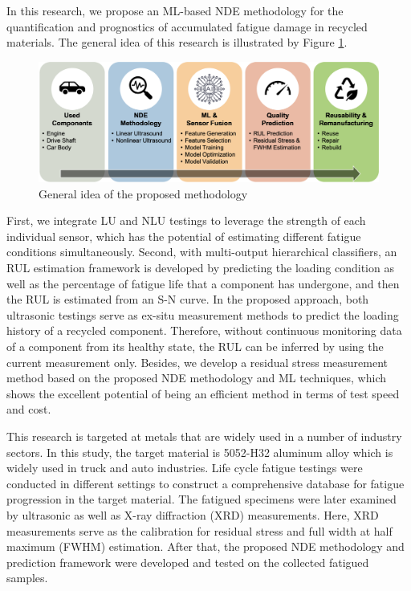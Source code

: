 In this research, we propose an ML-based NDE methodology for the quantification and prognostics of accumulated fatigue damage in recycled materials. The general idea of this research is illustrated by Figure \ref{fig: general idea}.
\begin{figure}[tb]
    \centering
    \includegraphics[width=\linewidth]{fig/general_idea.png}
    \caption{General idea of the proposed methodology}
    \label{fig: general idea}
\end{figure}
 First, we integrate LU and NLU testings to leverage the strength of each individual sensor, which has the potential of estimating different fatigue conditions simultaneously.
Second, with multi-output hierarchical classifiers,
an RUL estimation framework is developed by predicting the loading condition as well as the percentage of fatigue life that a component has undergone, and then the RUL is estimated from an S-N curve. In the proposed approach, both ultrasonic testings serve as ex-situ measurement methods to predict the loading history of a recycled component. Therefore, without continuous monitoring data of a component from its healthy state, the RUL can be inferred by using the current measurement only. Besides, we develop a residual stress measurement method based on the proposed NDE methodology and ML techniques, which shows the excellent potential of being an efficient method in terms of test speed and cost.

This research is targeted at metals that are widely used in a number of industry sectors. In this study, the target material is 5052-H32 aluminum alloy which is widely used in truck and auto industries. Life cycle fatigue testings were conducted in different settings to construct a comprehensive database for fatigue progression in the target material. The fatigued specimens were later examined by ultrasonic as well as X-ray diffraction (XRD) measurements. Here, XRD measurements serve as the calibration for residual stress and full width at half maximum (FWHM) estimation. After that, the proposed NDE methodology and prediction framework were developed and tested on the collected fatigued samples.

